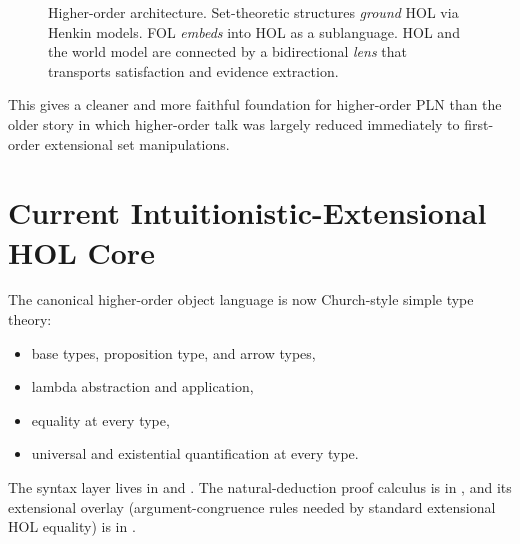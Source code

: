 \documentclass[11pt,openany]{report}
\begin{document}
\begin{figure}[htbp]
\centering
{}
\caption{Higher-order architecture.  Set-theoretic structures \emph{ground}
HOL via Henkin models.  FOL \emph{embeds} into HOL as a sublanguage.  HOL
and the world model are connected by a bidirectional \emph{lens} that
transports satisfaction and evidence extraction.}
\label{fig:higher-order-architecture}
\end{figure}

This gives a cleaner and more faithful foundation for higher-order PLN than
the older story in which higher-order talk was largely reduced immediately to
first-order extensional set manipulations.

\section{Current Intuitionistic-Extensional HOL Core}

The canonical higher-order object language is now Church-style simple type
theory:
\begin{itemize}
\item base types, proposition type, and arrow types,
\item lambda abstraction and application,
\item equality at every type,
\item universal and existential quantification at every type.
\end{itemize}

The syntax layer lives in
 and
.
The natural-deduction proof calculus is in
, and its extensional overlay
(argument-congruence rules needed by standard extensional HOL equality) is in
.
\end{document}
